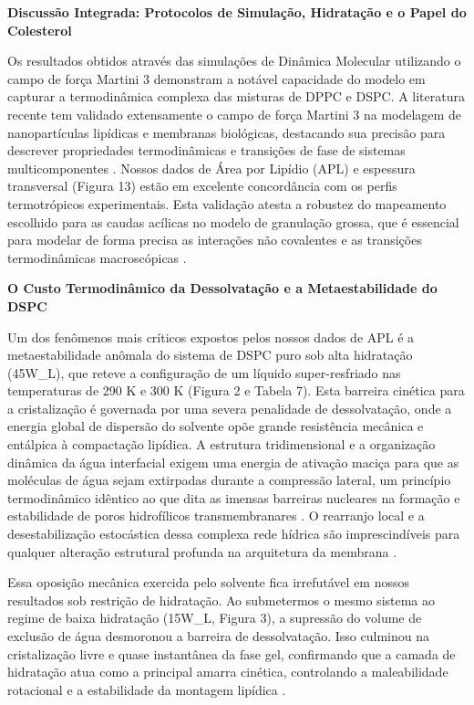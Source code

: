 \vspace{1em}
\noindent\textbf{Discussão Integrada: Protocolos de Simulação, Hidratação e o Papel do Colesterol}

Os resultados obtidos através das simulações de Dinâmica Molecular utilizando o campo de força Martini 3 demonstram a notável capacidade do modelo em capturar a termodinâmica complexa das misturas de DPPC e DSPC. A literatura recente tem validado extensamente o campo de força Martini 3 na modelagem de nanopartículas lipídicas e membranas biológicas, destacando sua precisão para descrever propriedades termodinâmicas e transições de fase de sistemas multicomponentes \cite{kjolbye2024}. Nossos dados de Área por Lipídio (APL) e espessura transversal (Figura 13) estão em excelente concordância com os perfis termotrópicos experimentais. Esta validação atesta a robustez do mapeamento escolhido para as caudas acílicas no modelo de granulação grossa, que é essencial para modelar de forma precisa as interações não covalentes e as transições termodinâmicas macroscópicas \cite{kjolbye2024}.

\vspace{1em}
\noindent\textbf{O Custo Termodinâmico da Dessolvatação e a Metaestabilidade do DSPC}

Um dos fenômenos mais críticos expostos pelos nossos dados de APL é a metaestabilidade anômala do sistema de DSPC puro sob alta hidratação (45W\_L), que reteve a configuração de um líquido super-resfriado nas temperaturas de 290 K e 300 K (Figura 2 e Tabela 7). Esta barreira cinética para a cristalização é governada por uma severa penalidade de dessolvatação, onde a energia global de dispersão do solvente opõe grande resistência mecânica e entálpica à compactação lipídica. A estrutura tridimensional e a organização dinâmica da água interfacial exigem uma energia de ativação maciça para que as moléculas de água sejam extirpadas durante a compressão lateral, um princípio termodinâmico idêntico ao que dita as imensas barreiras nucleares na formação e estabilidade de poros hidrofílicos transmembranares \cite{hu2015, rivel2025}. O rearranjo local e a desestabilização estocástica dessa complexa rede hídrica são imprescindíveis para qualquer alteração estrutural profunda na arquitetura da membrana \cite{yurtsever2026}.

Essa oposição mecânica exercida pelo solvente fica irrefutável em nossos resultados sob restrição de hidratação. Ao submetermos o mesmo sistema ao regime de baixa hidratação (15W\_L, Figura 3), a supressão do volume de exclusão de água desmoronou a barreira de dessolvatação. Isso culminou na cristalização livre e quase instantânea da fase gel, confirmando que a camada de hidratação atua como a principal amarra cinética, controlando a maleabilidade rotacional e a estabilidade da montagem lipídica \cite{yurtsever2026}.


